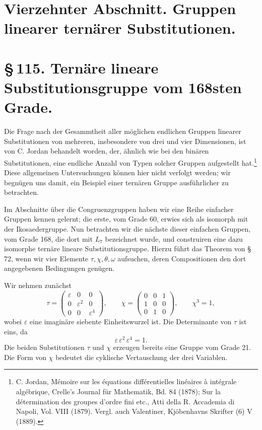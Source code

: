 \documentclass[11pt]{article}
\newcommand{\eps}{\varepsilon}
\newcommand{\mat}[1]{\begin{pmatrix}#1\end{pmatrix}}
\begin{document}
\section*{Vierzehnter Abschnitt. Gruppen linearer ternärer Substitutionen.}

\section*{\S\,115. Ternäre lineare Substitutionsgruppe vom 168sten Grade.}

Die Frage nach der Gesammtheit aller möglichen endlichen Gruppen linearer Substitutionen von mehreren, insbesondere von drei und vier Dimensionen, ist von C. Jordan behandelt worden, der, ähnlich wie bei den binären Substitutionen, eine endliche Anzahl von Typen solcher Gruppen aufgestellt hat.\footnote{C. Jordan, Mémoire sur les équations différentielles linéaires à intégrale algébrique, Crelle's Journal für Mathematik, Bd. 84 (1878); Sur la détermination des groupes d'ordre fini etc., Atti della R. Accademia di Napoli, Vol. VIII (1879). Vergl. auch Valentiner, Kjöbenhavns Skrifter (6) V (1889).} Diese allgemeinen Untersuchungen können hier nicht verfolgt werden; wir begnügen uns damit, ein Beispiel einer ternären Gruppe ausführlicher zu betrachten.

Im Abschnitte über die Congruenzgruppen haben wir eine Reihe einfacher Gruppen kennen gelernt; die erste, vom Grade 60, erwies sich als isomorph mit der Ikosaedergruppe. Nun betrachten wir die nächste dieser einfachen Gruppen, vom Grade 168, die dort mit \(L_7\) bezeichnet wurde, und construiren eine dazu isomorphe ternäre lineare Substitutionsgruppe. Hierzu führt das Theorem von \S\,72, wenn wir vier Elemente \(\tau,\chi,\theta,\omega\) aufsuchen, deren Compositionen den dort angegebenen Bedingungen genügen.

Wir nehmen zunächst
\begin{equation}
\tau=\mat{\eps&0&0\\0&\eps^2&0\\0&0&\eps^4},
\qquad
\chi=\mat{0&0&1\\1&0&0\\0&1&0},
\qquad \chi^3=1,
\tag{1}
\end{equation}
wobei \(\eps\) eine imaginäre siebente Einheitswurzel ist. Die Determinante von \(\tau\) ist eins, da
\begin{equation}
\eps\,\eps^2\,\eps^4=1.
\tag{2}
\end{equation}
Die beiden Substitutionen \(\tau\) und \(\chi\) erzeugen bereits eine Gruppe vom Grade 21. Die Form von \(\chi\) bedeutet die cyklische Vertauschung der drei Variablen.
\end{document}
